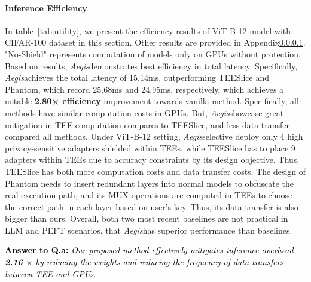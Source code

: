 \documentclass{article}
\newcommand{\method}{\textit{Aegis}}
\begin{document}
\paragraph{Inference Efficiency} In table~\ref{tab:utility}, we present the efficiency results of ViT-B-12 model with CIFAR-100 dataset in this section. Other results are provided in Appendix\ref{}. "No-Shield" represents computation of models only on GPUs without protection. 
Based on results, \method demonstrates best efficiency in total latency. Specifically, \method achieves the total latency of 15.14ms, outperforming TEESlice and Phantom, which record 25.68ms and 24.95ms, respectively, which achieves a notable \textbf{2.80× efficiency} improvement towards vanilla method. 
Specifically, all methods have similar computation costs in GPUs. But, \method showcase great mitigation in TEE computation compares to TEESlice, and less data transfer compared all methods. Under ViT-B-12 setting, \method selective deploy only 4 high privacy-sensitive adapters shielded within TEEs, while TEESlice has to place 9 adapters within TEEs due to accuracy constraints by its design objective. Thus, TEESlice has both more computation costs and data transfer costs. The design of Phantom needs to insert redundant layers into normal models to obfuscate the real execution path, and its MUX operations are computed in TEEs to choose the correct path in each layer based on user's key. Thus, its data transfer is also bigger than ours. Overall, both two most recent baselines are not practical in LLM and PEFT scenarios, that \method has superior performance than baselines.
\begin{center}
    \begin{tcolorbox}[
            colframe=black,width=1\linewidth,
            arc=1mm, auto outer arc]
            \textcolor{black}{{\textbf{Answer to Q.a:} 
            \textit{Our proposed method effectively mitigates inference overhead \textbf{ 2.16 $\times$} by reducing the weights and reducing the frequency of data transfers between TEE and GPUs.}}}
    \end{tcolorbox}
\end{center}
\end{document}
